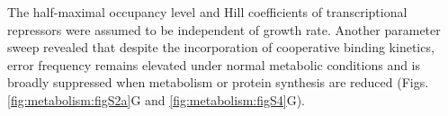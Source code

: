 The half-maximal occupancy level and Hill coefficients of transcriptional repressors were assumed to be independent of growth rate. Another parameter sweep revealed that despite the incorporation of cooperative binding kinetics, error frequency remains elevated under normal metabolic conditions and is broadly suppressed when metabolism or protein synthesis are reduced (Figs. \ref{fig:metabolism:figS2a}G and \ref{fig:metabolism:figS4}G).
